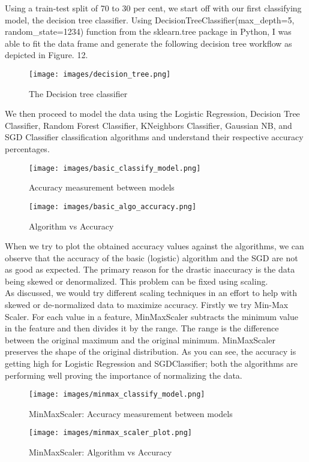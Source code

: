\documentclass[10pt,twocolumn,letterpaper]{article}
\begin{document}
Using a train-test split of 70 to 30 per cent, we start off with our first classifying model, the decision tree classifier. Using DecisionTreeClassifier(max\_depth=5, random\_state=1234) function from the sklearn.tree package in Python, I was able to fit the data frame and generate the following decision tree workflow as depicted in Figure. 12. \\ 

\begin{figure}[h]
\centering
\texttt{[image: images/decision\_tree.png]} 
\caption{The Decision tree classifier}
\end{figure}


We then proceed to model the data using the Logistic Regression, Decision Tree Classifier, Random Forest Classifier, KNeighbors Classifier, Gaussian NB, and SGD Classifier classification algorithms and understand their respective accuracy percentages. 

\begin{figure}[h]
\centering
\texttt{[image: images/basic\_classify\_model.png]}
\caption{Accuracy measurement between models}
\centering
\texttt{[image: images/basic\_algo\_accuracy.png]} 
\caption{Algorithm vs Accuracy}
\end{figure}

When we try to plot the obtained accuracy values against the algorithms, we can observe that the accuracy of the basic (logistic) algorithm and the SGD are not as good as expected. The primary reason for the drastic inaccuracy is the data being skewed or denormalized. This problem can be fixed using scaling. \\

As discussed, we would try different scaling techniques in an effort to help with skewed or de-normalized data to maximize accuracy. Firstly we try Min-Max Scaler. For each value in a feature, MinMaxScaler subtracts the minimum value in the feature and then divides it by the range. The range is the difference between the original maximum and the original minimum. MinMaxScaler preserves the shape of the original distribution. As you can see, the accuracy is getting high for Logistic Regression and SGDClassifier; both the algorithms are performing well proving the importance of normalizing the data. 

\begin{figure}[h]
\centering
\texttt{[image: images/minmax\_classify\_model.png]}
\caption{MinMaxScaler: Accuracy measurement between models}

\centering
\texttt{[image: images/minmax\_scaler\_plot.png]} 
\caption{MinMaxScaler: Algorithm vs Accuracy}
\end{figure}
\end{document}
